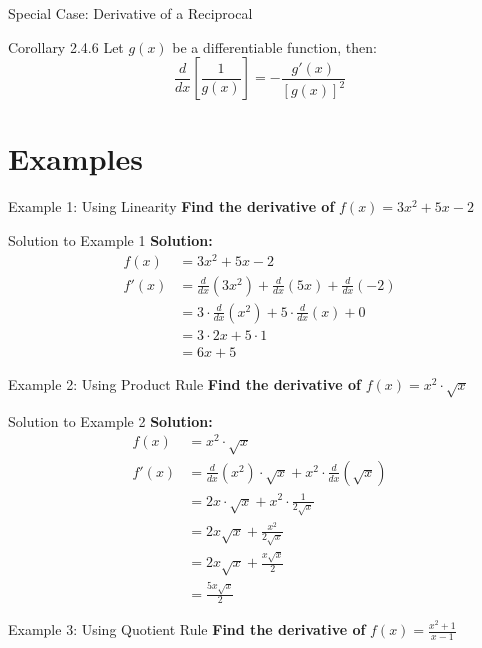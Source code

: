 \documentclass[aspectratio=169]{beamer}
\begin{document}
\begin{frame}{Special Case: Derivative of a Reciprocal}
\begin{block}{Corollary 2.4.6}
Let $g(x)$ be a differentiable function, then:
\[
\frac{d}{dx}\left[\frac{1}{g(x)}\right] = -\frac{g'(x)}{[g(x)]^2}
\]
\end{block}
\end{frame}

\section{Examples}

\begin{frame}{Example 1: Using Linearity}
\textbf{Find the derivative of } $f(x) = 3x^2 + 5x - 2$
\end{frame}

\begin{frame}{Solution to Example 1}
\textbf{Solution:}
\[
\begin{aligned}
  f(x) &= 3x^2 + 5x - 2 \\
  f'(x) &= \frac{d}{dx}(3x^2) + \frac{d}{dx}(5x) + \frac{d}{dx}(-2) \\
  &= 3 \cdot \frac{d}{dx}(x^2) + 5 \cdot \frac{d}{dx}(x) + 0 \\
  &= 3 \cdot 2x + 5 \cdot 1 \\
  &= 6x + 5
\end{aligned}
\]
\end{frame}

\begin{frame}{Example 2: Using Product Rule}
\textbf{Find the derivative of } $f(x) = x^2 \cdot \sqrt{x}$
\end{frame}

\begin{frame}{Solution to Example 2}
\textbf{Solution:}
\[
\begin{aligned}
  f(x) &= x^2 \cdot \sqrt{x} \\
  f'(x) &= \frac{d}{dx}(x^2) \cdot \sqrt{x} + x^2 \cdot \frac{d}{dx}(\sqrt{x}) \\
  &= 2x \cdot \sqrt{x} + x^2 \cdot \frac{1}{2\sqrt{x}} \\
  &= 2x\sqrt{x} + \frac{x^2}{2\sqrt{x}} \\
  &= 2x\sqrt{x} + \frac{x\sqrt{x}}{2} \\
  &= \frac{5x\sqrt{x}}{2}
\end{aligned}
\]
\end{frame}

\begin{frame}{Example 3: Using Quotient Rule}
\textbf{Find the derivative of } $f(x) = \frac{x^2 + 1}{x - 1}$
\end{frame}
\end{document}
